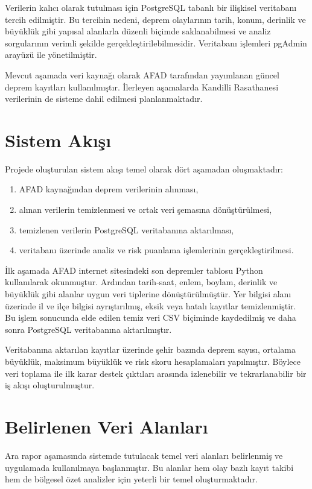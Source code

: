\documentclass[12pt,a4paper]{report}
\begin{document}
Verilerin kalıcı olarak tutulması için PostgreSQL tabanlı bir ilişkisel veritabanı
tercih edilmiştir. Bu tercihin nedeni, deprem olaylarının tarih, konum, derinlik ve
büyüklük gibi yapısal alanlarla düzenli biçimde saklanabilmesi ve analiz sorgularının
verimli şekilde gerçekleştirilebilmesidir. Veritabanı işlemleri pgAdmin arayüzü ile
yönetilmiştir.

Mevcut aşamada veri kaynağı olarak AFAD tarafından yayımlanan güncel deprem kayıtları
kullanılmıştır. İlerleyen aşamalarda Kandilli Rasathanesi verilerinin de sisteme dahil
edilmesi planlanmaktadır.

\section{Sistem Akışı}

Projede oluşturulan sistem akışı temel olarak dört aşamadan oluşmaktadır:

\begin{enumerate}
    \item AFAD kaynağından deprem verilerinin alınması,
    \item alınan verilerin temizlenmesi ve ortak veri şemasına dönüştürülmesi,
    \item temizlenen verilerin PostgreSQL veritabanına aktarılması,
    \item veritabanı üzerinde analiz ve risk puanlama işlemlerinin gerçekleştirilmesi.
\end{enumerate}

İlk aşamada AFAD internet sitesindeki son depremler tablosu Python kullanılarak
okunmuştur. Ardından tarih-saat, enlem, boylam, derinlik ve büyüklük gibi alanlar
uygun veri tiplerine dönüştürülmüştür. Yer bilgisi alanı üzerinde il ve ilçe bilgisi
ayrıştırılmış, eksik veya hatalı kayıtlar temizlenmiştir. Bu işlem sonucunda elde
edilen temiz veri CSV biçiminde kaydedilmiş ve daha sonra PostgreSQL veritabanına
aktarılmıştır.

Veritabanına aktarılan kayıtlar üzerinde şehir bazında deprem sayısı, ortalama
büyüklük, maksimum büyüklük ve risk skoru hesaplamaları yapılmıştır. Böylece veri
toplama ile ilk karar destek çıktıları arasında izlenebilir ve tekrarlanabilir bir
iş akışı oluşturulmuştur.

\section{Belirlenen Veri Alanları}

Ara rapor aşamasında sistemde tutulacak temel veri alanları belirlenmiş ve uygulamada
kullanılmaya başlanmıştır. Bu alanlar hem olay bazlı kayıt takibi hem de bölgesel
özet analizler için yeterli bir temel oluşturmaktadır.
\end{document}
